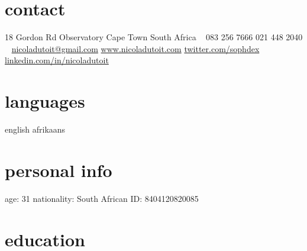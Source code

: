 \documentclass[]{friggeri-cv} %
\begin{document}


\begin{aside} %
\section{contact}
18 Gordon Rd
Observatory
Cape Town
South Africa
~
083 256 7666
021 448 2040
~
\href{mailto:nicoladutoit@gmail.com}{nicoladutoit@gmail.com}
\href{http://www.nicoladutoit.com}{www.nicoladutoit.com}
\href{https://twitter.com/sophdex}{twitter.com/sophdex}
\href{http://za.linkedin.com/in/nicoladutoit/}{linkedin.com/in/nicoladutoit}
\section{languages}
english 
afrikaans
\section{personal info}
age: 31
nationality: South African
ID: 8404120820085
\end{aside}


\section{education}
\end{document}
